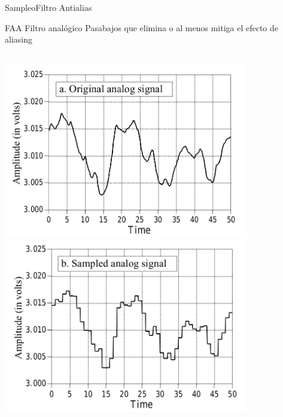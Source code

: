  \begin{frame}{Sampleo}{Filtro Antialias}
    \begin{block}{FAA}
       Filtro \alert{analógico} Pasabajos que elimina o al menos mitiga el efecto de aliasing
    \end{block}
    \begin{columns}[onlytextwidth]
       \center\includegraphics[width=0.8\textwidth]{1_clase/filtro_anti_alias1}
       \center\includegraphics[width=0.8\textwidth]{1_clase/filtro_anti_alias2}
    \end{columns}
    \vfill
 \end{frame}
